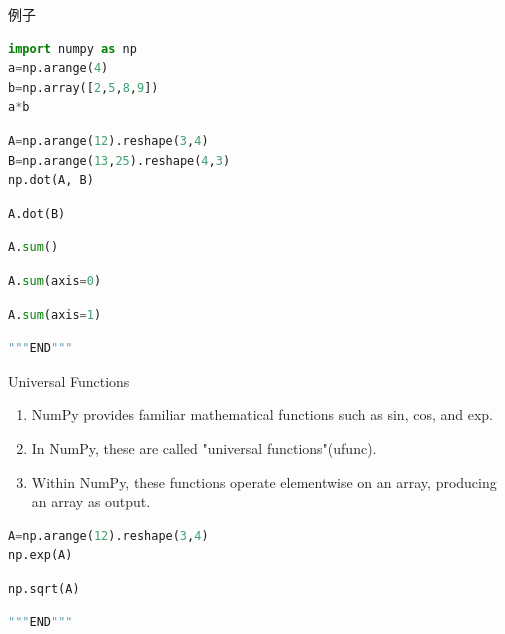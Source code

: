 \documentclass[ignorenonframetext,11pt,xcolor=dvipsnames,hyperref={colorlinks,allcolors=.,urlcolor=blue, citecolor=violet, bookmarksdepth=4},aspectratio=1610]{beamer}
\providecommand{\tightlist}{%
  \setlength{\itemsep}{0pt}\setlength{\parskip}{0pt}}
\begin{document}
\begin{frame}[fragile]{例子}
\protect\hypertarget{section}{}

\begin{lstlisting}[language=Python]
import numpy as np
a=np.arange(4)
b=np.array([2,5,8,9])
a*b
\end{lstlisting}

\begin{lstlisting}[language=Python]
A=np.arange(12).reshape(3,4)
B=np.arange(13,25).reshape(4,3)
np.dot(A, B)
\end{lstlisting}

\begin{lstlisting}[language=Python]
A.dot(B)
\end{lstlisting}

\begin{lstlisting}[language=Python]
A.sum()
\end{lstlisting}

\begin{lstlisting}[language=Python]
A.sum(axis=0)
\end{lstlisting}

\begin{lstlisting}[language=Python]
A.sum(axis=1)
\end{lstlisting}

\begin{lstlisting}[language=Python]
"""END"""
\end{lstlisting}

\end{frame}

\begin{frame}[fragile]{Universal Functions}
\protect\hypertarget{universal-functions}{}

\begin{enumerate}
\tightlist
\item
  NumPy provides familiar mathematical functions such as sin, cos, and
  exp.
\item
  In NumPy, these are called "universal functions"(ufunc).
\item
  Within NumPy, these functions operate elementwise on an array,
  producing an array as output.
\end{enumerate}

\begin{lstlisting}[language=Python]
A=np.arange(12).reshape(3,4)
np.exp(A)
\end{lstlisting}

\begin{lstlisting}[language=Python]
np.sqrt(A)
\end{lstlisting}

\begin{lstlisting}[language=Python]
"""END"""
\end{lstlisting}

\end{frame}
\end{document}
